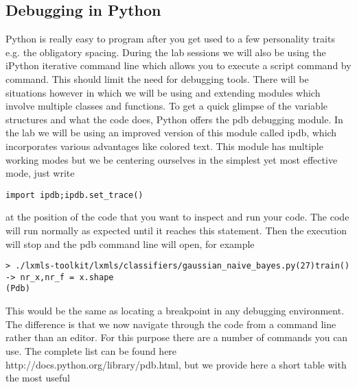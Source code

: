 \subsection{Debugging in Python}

Python is really easy to program after you get used to a few personality traits e.g. the obligatory spacing. During the lab sessions we will also be using the iPython iterative command line which allows you to execute a script command by command. This should limit the need for debugging tools. There will be situations however in which we will be using and extending modules which involve multiple classes and functions. To get a quick glimpse of the variable structures and what the code does, Python offers the pdb debugging module. In the lab we will be using an improved version of this module called ipdb, which incorporates various advantages like colored text. This module has multiple working modes but we be centering ourselves in the simplest yet most effective mode, just write

\begin{verbatim}
import ipdb;ipdb.set_trace() 
\end{verbatim}
 
at the position of the code that you want to inspect and run your code. The code will run normally as expected until it reaches this statement. Then the execution will stop and the pdb command line will open, for example

\begin{verbatim}
> ./lxmls-toolkit/lxmls/classifiers/gaussian_naive_bayes.py(27)train()
-> nr_x,nr_f = x.shape
(Pdb) 
\end{verbatim} 

This would be the same as locating a breakpoint in any debugging environment. The difference is that we now navigate through the code from a command line rather than an editor. For this purpose there are a number of commands you can use. The complete list can be found here http://docs.python.org/library/pdb.html, but we provide here a short table with the most useful  

